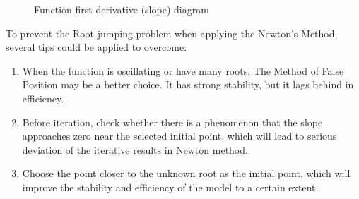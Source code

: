 \begin{solution}
\begin{enumerate}[label=(\alph*)]
\begin{figure}
{}

\caption{Function first derivative (slope) diagram}
\label{Q5_d_4}
\end{figure}





To prevent the Root jumping problem when applying the Newton's Method, several tips could be applied to overcome:
\begin{enumerate}
	\item When the function is oscillating or have many roots, The Method of False Position may be a better choice. It has strong stability, but it lags behind in efficiency.
	\item Before iteration, check whether there is a phenomenon that the slope approaches zero near the selected initial point, which will lead to serious deviation of the iterative results in Newton method.
	\item  Choose the point closer to the unknown root as the initial point, which will improve the stability and efficiency of the model to a certain extent.
\end{enumerate}

















	
	
\end{enumerate}


\end{solution}



